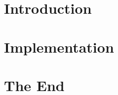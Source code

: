 \section[Intro]{Introduction}



\section[Impl]{Implementation}

% 
% 

\section[End]{The End}

% 

